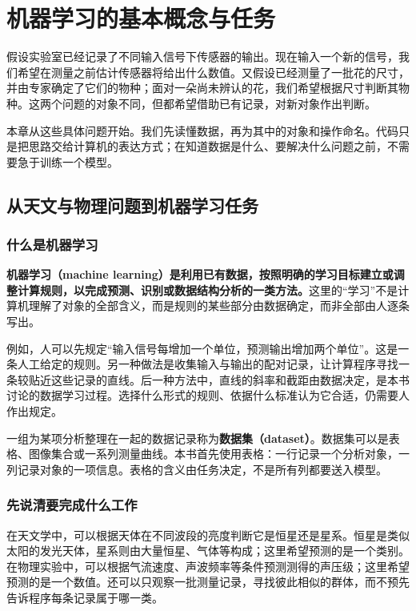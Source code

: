 \chapter{机器学习的基本概念与任务}
\label{chap:concepts}

假设实验室已经记录了不同输入信号下传感器的输出。现在输入一个新的信号，我们希望在测量之前估计传感器将给出什么数值。又假设已经测量了一批花的尺寸，并由专家确定了它们的物种；面对一朵尚未辨认的花，我们希望根据尺寸判断其物种。这两个问题的对象不同，但都希望借助已有记录，对新对象作出判断。

本章从这些具体问题开始。我们先读懂数据，再为其中的对象和操作命名。代码只是把思路交给计算机的表达方式；在知道数据是什么、要解决什么问题之前，不需要急于训练一个模型。

\section{从天文与物理问题到机器学习任务}
\subsection{什么是机器学习}
\textbf{机器学习（machine learning）是利用已有数据，按照明确的学习目标建立或调整计算规则，以完成预测、识别或数据结构分析的一类方法。}这里的“学习”不是计算机理解了对象的全部含义，而是规则的某些部分由数据确定，而非全部由人逐条写出。

例如，人可以先规定“输入信号每增加一个单位，预测输出增加两个单位”。这是一条人工给定的规则。另一种做法是收集输入与输出的配对记录，让计算程序寻找一条较贴近这些记录的直线。后一种方法中，直线的斜率和截距由数据决定，是本书讨论的数据学习过程。选择什么形式的规则、依据什么标准认为它合适，仍需要人作出规定。

一组为某项分析整理在一起的数据记录称为\textbf{数据集（dataset）}。数据集可以是表格、图像集合或一系列测量曲线。本书首先使用表格：一行记录一个分析对象，一列记录对象的一项信息。表格的含义由任务决定，不是所有列都要送入模型。

\subsection{先说清要完成什么工作}
在天文学中，可以根据天体在不同波段的亮度判断它是恒星还是星系。恒星是类似太阳的发光天体，星系则由大量恒星、气体等构成；这里希望预测的是一个类别。在物理实验中，可以根据气流速度、声波频率等条件预测测得的声压级；这里希望预测的是一个数值。还可以只观察一批测量记录，寻找彼此相似的群体，而不预先告诉程序每条记录属于哪一类。

